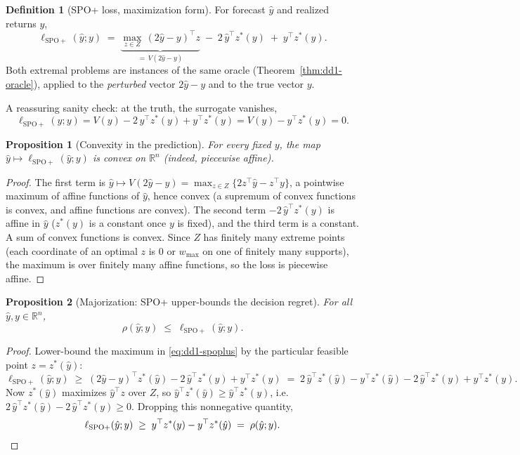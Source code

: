 \documentclass[11pt,a4paper]{article}
\theoremstyle{definition}
\newtheorem{definition}{Definition}[section]
\theoremstyle{plain}
\newtheorem{proposition}{Proposition}[section]
\newcommand{\R}{\mathbb{R}}
\begin{document}
\begin{definition}[SPO+ loss, maximization form]
\label{def:dd1-spoplus}
For forecast $\hat{y}$ and realized returns $y$,
\begin{equation}
\label{eq:dd1-spoplus}
\ell_{\mathrm{SPO+}}(\hat{y}; y)
\;=\; \underbrace{\max_{z \in Z}\, (2\hat{y} - y)^\top z}_{\textstyle
= \,V(2\hat{y} - y)}
\;-\; 2\,\hat{y}^\top z^*(y)
\;+\; y^\top z^*(y).
\end{equation}
Both extremal problems are instances of the same oracle
(Theorem~\ref{thm:dd1-oracle}), applied to the \emph{perturbed} vector
$2\hat{y} - y$ and to the true vector $y$.
\end{definition}

A reassuring sanity check: at the truth, the surrogate vanishes,
\[
\ell_{\mathrm{SPO+}}(y; y) = V(y) - 2\,y^\top z^*(y) + y^\top z^*(y)
= V(y) - y^\top z^*(y) = 0 .
\]

\begin{proposition}[Convexity in the prediction]
\label{prop:dd1-spoplus-convex}
For every fixed $y$, the map $\hat{y} \mapsto \ell_{\mathrm{SPO+}}(\hat{y}; y)$
is convex on $\R^n$ (indeed, piecewise affine).
\end{proposition}

\begin{proof}
The first term is $\hat{y} \mapsto V(2\hat{y} - y) =
\max_{z \in Z} \{ 2 z^\top \hat{y} - z^\top y \}$, a pointwise maximum of
affine functions of $\hat{y}$, hence convex (a supremum of convex functions is
convex, and affine functions are convex). The second term
$-2\,\hat{y}^\top z^*(y)$ is affine in $\hat{y}$ ($z^*(y)$ is a constant once
$y$ is fixed), and the third term is a constant. A sum of convex functions is
convex. Since $Z$ has finitely many extreme points (each coordinate of an
optimal $z$ is $0$ or $w_{\max}$ on one of finitely many supports), the
maximum is over finitely many affine functions, so the loss is piecewise
affine.
\end{proof}

\begin{proposition}[Majorization: SPO+ upper-bounds the decision regret]
\label{prop:dd1-spoplus-majorize}
For all $\hat{y}, y \in \R^n$,
\begin{equation}
\label{eq:dd1-majorize}
\rho(\hat{y}; y) \;\le\; \ell_{\mathrm{SPO+}}(\hat{y}; y).
\end{equation}
\end{proposition}

\begin{proof}
Lower-bound the maximum in \eqref{eq:dd1-spoplus} by the particular feasible
point $z = z^*(\hat{y})$:
\[
\ell_{\mathrm{SPO+}}(\hat{y}; y)
\;\ge\; (2\hat{y} - y)^\top z^*(\hat{y}) - 2\,\hat{y}^\top z^*(y)
+ y^\top z^*(y)
\;=\; 2\,\hat{y}^\top z^*(\hat{y}) - y^\top z^*(\hat{y})
- 2\,\hat{y}^\top z^*(y) + y^\top z^*(y).
\]
Now $z^*(\hat{y})$ maximizes $\hat{y}^\top z$ over $Z$, so
$\hat{y}^\top z^*(\hat{y}) \ge \hat{y}^\top z^*(y)$, i.e.\
$2\,\hat{y}^\top z^*(\hat{y}) - 2\,\hat{y}^\top z^*(y) \ge 0$. Dropping this
nonnegative quantity,
\[
\ell_{\mathrm{SPO+}}(\hat{y}; y)
\;\ge\; y^\top z^*(y) - y^\top z^*(\hat{y})
\;=\; \rho(\hat{y}; y). \qedhere
\]
\end{proof}
\end{document}
